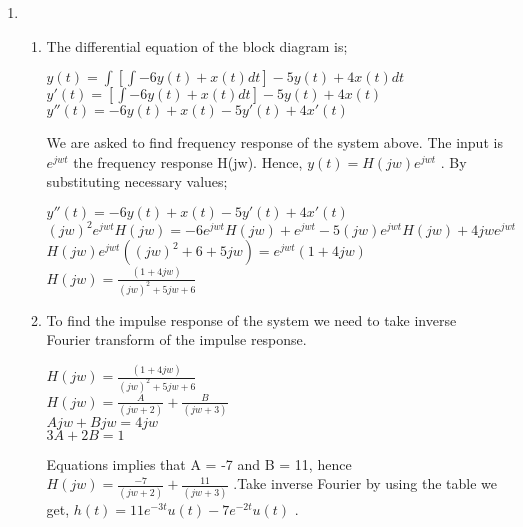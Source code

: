 \documentclass[10pt,a4paper, margin=1in]{article}
\begin{document}
\begin{enumerate}
\item
\begin{enumerate}
    \item 
    The differential equation of the block diagram is; \\
    \begin{center}
        $y(t) = \int [\int -6y(t)+x(t)dt] - 5y(t)+4x(t) dt$ \\
        $y'(t) = [\int -6y(t)+x(t)dt] - 5y(t)+4x(t) $ \\
        $y''(t) = -6y(t)+x(t) - 5y'(t)+4x'(t) $ \\
    \end{center}
    We are asked to find frequency response of the system above. The input is $e^{jwt}$ the frequency response H(jw). Hence, $y(t) = H(jw)e^{jwt}$ . By substituting necessary values;
    \begin{center}
        $y''(t) = -6y(t)+x(t) - 5y'(t)+4x'(t) $ \\ $ $ \\
        $(jw)^2e^{jwt}H(jw) = -6e^{jwt}H(jw) + e^{jwt} - 5(jw)e^{jwt}H(jw) + 4jwe^{jwt}$ \\ $ $ \\
        $H(jw)e^{jwt}((jw)^2 + 6 + 5jw) = e^{jwt}(1+ 4jw)  $ \\ $ $ \\
        $H(jw) = \frac{(1+ 4jw) }{(jw)^2 + 5jw + 6}$ \\ $ $ \\
    \end{center}
    \item 
    To find the impulse response of the system we need to take inverse Fourier transform of the impulse response. 
    \begin{center}
        $H(jw) = \frac{(1+ 4jw) }{(jw)^2 + 5jw + 6}$ \\ $ $ \\
        $H(jw) = \frac{A}{(jw + 2)} + \frac{B}{(jw + 3)}$ \\ $ $ \\
        $Ajw + Bjw = 4jw$ \\ $ $ \\
        $3A + 2B = 1$ \\ $ $ \\
    \end{center}
    Equations implies that A = -7 and B = 11, hence $H(jw) =  \frac{-7}{(jw + 2)} + \frac{11}{(jw + 3)}$ .Take inverse Fourier by using the table we get, $h(t) = 11e^{-3t}u(t)-7e^{-2t}u(t)$ . \\

\end{enumerate}
\end{enumerate}
\end{document}
